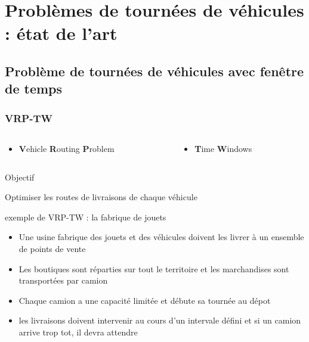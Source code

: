\documentclass{beamer}
\begin{document}
\section{Problèmes de tournées de véhicules : état de l'art}

\subsection*{Problème de tournées de véhicules avec fenêtre de temps}

\begin{frame}
\frametitle{VRP-TW\cite{Berbeglia07}}
	\begin{columns}
	 	\begin{column}[l]{6cm} \begin{center}
			\begin{itemize}
 				\item \small{\textbf{V}ehicle \textbf{R}outing \textbf{P}roblem}
			\end{itemize} \end{center}
	 	\end{column}
	 	\begin{column}[r]{6cm} \begin{center}
			\begin{itemize} 
				\item \small{\textbf{T}ime \textbf{W}indows}
			\end{itemize} \end{center}
	 	\end{column}
	\end{columns}
	\begin{block}{Objectif}
		\begin{center} Optimiser les routes de livraisons de chaque véhicule\end{center}
	\end{block}
		
	\begin{exampleblock}{exemple de VRP-TW : la fabrique de jouets}
		\small{\begin{itemize}
			\item Une usine fabrique des jouets et des véhicules doivent les livrer à un ensemble de points de vente
			\item Les boutiques sont réparties sur tout le territoire et les marchandises sont transportées par camion
			\item Chaque camion a une capacité limitée et débute sa tournée au dépot
			\item les livraisons doivent intervenir au cours d'un intervale défini et si un camion arrive trop tot, il devra attendre
		\end{itemize}}
	\end{exampleblock}
\end{frame}
\end{document}
